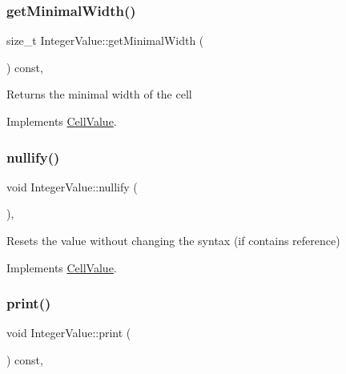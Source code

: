 \subsubsection{\texorpdfstring{get\+Minimal\+Width()}{getMinimalWidth()}}
{\footnotesize\ttfamily size\+\_\+t Integer\+Value\+::get\+Minimal\+Width (\begin{DoxyParamCaption}{ }\end{DoxyParamCaption}) const\hspace{0.3cm}{\ttfamily [override]}, {\ttfamily [virtual]}}

Returns the minimal width of the cell 

Implements \hyperlink{classCellValue_ad96473ba3dd88b83da96c03ae31a2ede}{Cell\+Value}.

\mbox{\label{classIntegerValue_a6232180f3447a08a204612dfa9543631}} 
\subsubsection{\texorpdfstring{nullify()}{nullify()}}
{\footnotesize\ttfamily void Integer\+Value\+::nullify (\begin{DoxyParamCaption}{ }\end{DoxyParamCaption})\hspace{0.3cm}{\ttfamily [override]}, {\ttfamily [virtual]}}

Resets the value without changing the syntax (if contains reference) 

Implements \hyperlink{classCellValue_af4f30a4b36e159f2f2bfc7ed83f1b37a}{Cell\+Value}.

\mbox{\label{classIntegerValue_a3cf6394dee28b404446eff2c6b727634}} 
\subsubsection{\texorpdfstring{print()}{print()}}
{\footnotesize\ttfamily void Integer\+Value\+::print (\begin{DoxyParamCaption}{ }\end{DoxyParamCaption}) const\hspace{0.3cm}{\ttfamily [override]}, {\ttfamily [virtual]}}

